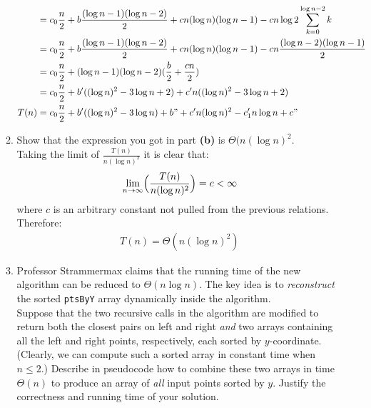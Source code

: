 \documentclass[11pt]{article}
\begin{document}
\begin{enumerate}
\begin{enumerate}
\begin{align*}
\\&=c_0 \frac{n}{2} + b \frac{(\log n-1)(\log n -2)}{2} + cn(\log n) (\log n -1)- cn \log 2 \sum_{k=0}^{\log n-2} k
\\&=c_0 \frac{n}{2} + b \frac{(\log n-1)(\log n -2)}{2} + cn(\log n) (\log n -1)- cn\frac{(\log n -2)(\log n -1)}{2}
\\&= c_0 \frac{n}{2} +(\log n-1)(\log n -2)(\frac{b}{2}+ \frac{cn}{2})
\\&= c_0 \frac{n}{2} + b'((\log n)^2 - 3 \log n +2)+c'n((\log n)^2 - 3 \log n +2)
\\T(n)&= c_0 \frac{n}{2} + b'((\log n)^2 - 3 \log n)+b" + c'n(\log n)^2 - c_1'n \log n + c"
\end{align*}
\newpage
\item Show that the expression you got in part \textbf{(b)} is $\Theta(n (\log n)^2$.\\
Taking the limit of $\frac{T(n)}{n (\log n)^2}$ it is clear that:
\begin{align*}
\lim_{n \to \infty} \Bigl( \frac{T(n)}{n(\log n)^2} \Bigr)= c < \infty
\end{align*}
where $c$ is an arbitrary constant not pulled from the previous relations.  Therefore:
\begin{align*}
T(n) =  \Theta(n (\log n)^2)
\end{align*}
\item Professor Strammermax claims that the running time of the new algorithm can be reduced to $\Theta( n \log n)$.  The key idea is to \textit{reconstruct} the sorted \texttt{ptsByY} array dynamically inside the algorithm.\\
Suppose that the two recursive calls in the algorithm are modified to return both the closest pairs on left and right \textit{and} two arrays containing all the left and right points, respectively, each sorted by $y$-coordinate.  (Clearly, we can compute such a sorted array in constant time when $n \leq 2$.)  Describe in pseudocode how to combine these two arrays in time $\Theta(n)$ to produce an array of \textit{all} input points sorted by $y$. Justify the correctness and running time of your solution.
\\
\\

\end{enumerate}
\end{enumerate}
\end{document}
